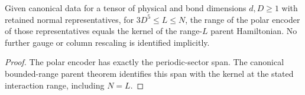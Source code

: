 \begin{lemma}
    \label{thm:ldp_sector_encoder_parent_kernel}
    \leanok
    Given canonical data for a tensor of physical and bond dimensions
    $d,D\ge1$ with retained normal representatives, for
    $3D^5\le L\le N$, the range of the polar encoder of those
    representatives equals the kernel of the range-$L$ parent Hamiltonian.
    No further gauge or column rescaling is identified implicitly.
\end{lemma}
\begin{proof}\leanok
    The polar encoder has exactly the periodic-sector span. The canonical
    bounded-range parent theorem identifies this span with the kernel
    at the stated interaction range, including $N=L$.
\end{proof}
